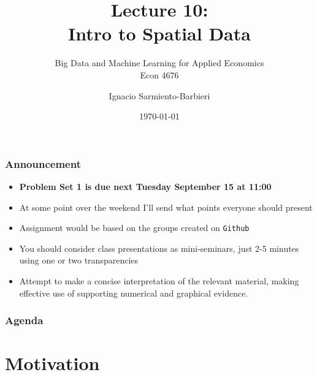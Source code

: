 \documentclass[
  shownotes,
  xcolor={svgnames},
  hyperref={colorlinks,citecolor=DarkBlue,linkcolor=DarkRed,urlcolor=DarkBlue}
  ]{beamer}
\begin{document}
\title[Lecture 10]{Lecture 10: \\ Intro to Spatial Data}
\subtitle{Big Data and Machine Learning for Applied Economics \\ Econ 4676}
\date{\today}

\author[Sarmiento-Barbieri]{Ignacio Sarmiento-Barbieri}


\begin{frame}[noframenumbering]
\maketitle
\end{frame}



\begin{frame}
\frametitle{Announcement }


\begin{itemize} 
    \item {\bf Problem Set 1 is due next Tuesday September 15 at 11:00} 
    \bigskip
    \item At some point over the weekend I'll send what points everyone should present
    \bigskip
    \item Assignment would be based on the groups created on \texttt{Github}
    \bigskip
    \item  You should consider class presentations as mini-seminars, just 2-5 minutes using one or two transparencies
    \bigskip
    \item  Attempt to make a concise interpretation of the relevant material, making effective use of supporting numerical and graphical evidence.    
\end{itemize}
\end{frame}


\begin{frame}
\frametitle{Agenda}

\tableofcontents

\end{frame}




\section{Motivation }
\end{document}
